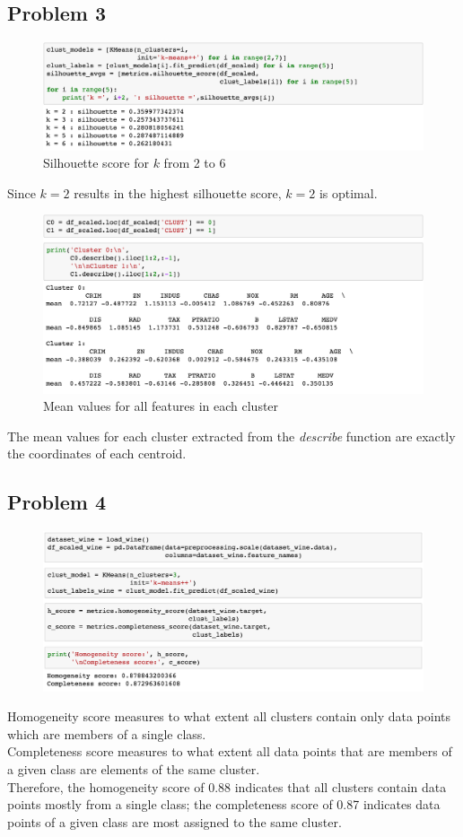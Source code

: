 \documentclass[12pt]{report}
\begin{document}
\subsection*{Problem 3}
\begin{figure}[H]
	\centering
	\includegraphics[width=\linewidth]{p3silhouettes.png}
	\caption{Silhouette score for $k$ from 2 to 6}
\end{figure}
Since $k=2$ results in the highest silhouette score, $k=2$ is optimal.
\begin{figure}[H]
	\centering
	\includegraphics[width=\linewidth]{p3coordinates.png}
	\caption{Mean values for all features in each cluster}
\end{figure}
\noindent The mean values for each cluster extracted from the \textit{describe} function are exactly the coordinates of each centroid.

\subsection*{Problem 4}
\begin{figure}[H]
	\centering
	\includegraphics[width=\linewidth]{p4.png}
\end{figure}
Homogeneity score measures to what extent all clusters contain only data points which are members of a single class.\\
Completeness score measures to what extent all data points that are members of a given class are elements of the same cluster.\\
Therefore, the homogeneity score of 0.88 indicates that all clusters contain data points mostly from a single class; the completeness score of 0.87 indicates data points of a given class are most assigned to the same cluster.
\end{document}

